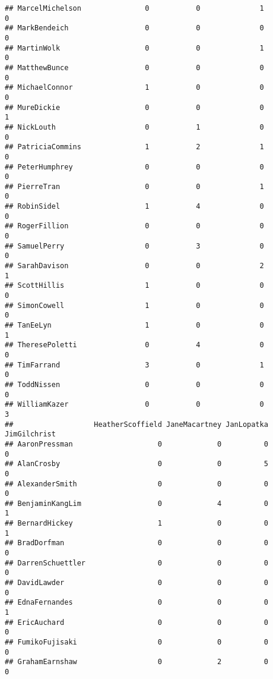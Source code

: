 \documentclass[
  12pt,
]{article}
\begin{document}
\begin{verbatim}
## MarcelMichelson               0           0              1              0
## MarkBendeich                  0           0              0              0
## MartinWolk                    0           0              1              0
## MatthewBunce                  0           0              0              0
## MichaelConnor                 1           0              0              0
## MureDickie                    0           0              0              1
## NickLouth                     0           1              0              0
## PatriciaCommins               1           2              1              0
## PeterHumphrey                 0           0              0              0
## PierreTran                    0           0              1              0
## RobinSidel                    1           4              0              0
## RogerFillion                  0           0              0              0
## SamuelPerry                   0           3              0              0
## SarahDavison                  0           0              2              1
## ScottHillis                   1           0              0              0
## SimonCowell                   1           0              0              0
## TanEeLyn                      1           0              0              1
## TheresePoletti                0           4              0              0
## TimFarrand                    3           0              1              0
## ToddNissen                    0           0              0              0
## WilliamKazer                  0           0              0              3
##                   HeatherScoffield JaneMacartney JanLopatka JimGilchrist
## AaronPressman                    0             0          0            0
## AlanCrosby                       0             0          5            0
## AlexanderSmith                   0             0          0            0
## BenjaminKangLim                  0             4          0            1
## BernardHickey                    1             0          0            1
## BradDorfman                      0             0          0            0
## DarrenSchuettler                 0             0          0            0
## DavidLawder                      0             0          0            0
## EdnaFernandes                    0             0          0            1
## EricAuchard                      0             0          0            0
## FumikoFujisaki                   0             0          0            0
## GrahamEarnshaw                   0             2          0            0

\end{verbatim}
\end{document}
